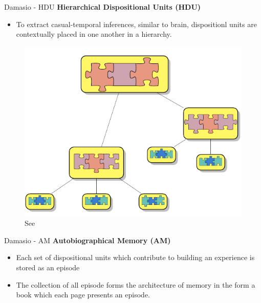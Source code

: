 \documentclass[handout]{beamer}
\begin{document}
\begin{frame}{Damasio - HDU}
	\textbf{Hierarchical Dispositional Units (HDU)}
	\begin{itemize}
		\item To extract casual-temporal inferences, similar to brain, dispositionl units are contextually placed in one another in a hierarchy.
	\end{itemize}
	\begin{figure}
		\includegraphics[scale=0.3]{regazzoni-2020-multi-sensorial-generative-and-descriptive-self-awareness-models-for-autonomous-systems-fig-3.png}
		\caption{See \cite{regazzoni-2020-multi-sensorial-generative-and-descriptive-self-awareness-models-for-autonomous-systems}}
	\end{figure}
\end{frame}

\begin{frame}{Damasio - AM}
	\textbf{Autobiographical Memory (AM)}
	\begin{itemize}
		\item Each set of dispositional units which contribute to building an experience is stored as an episode
		\item The collection of all episode forms the architecture of memory in the form a book which each page presents an episode. 
	\end{itemize}
\end{frame}
\end{document}

